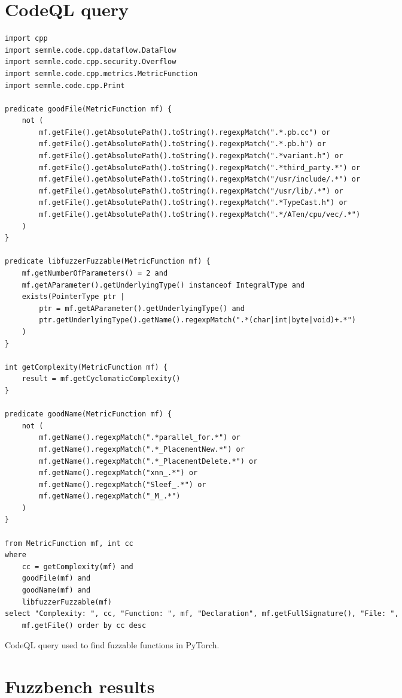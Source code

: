 \appendix

\section{CodeQL query} \label{appendix:codeql-query}

\renewcommand\theFancyVerbLine{\footnotesize\arabic{FancyVerbLine}}
\newenvironment{code}{\captionsetup{type=listing}}{}

\begin{code}
    \begin{verbatim}
import cpp
import semmle.code.cpp.dataflow.DataFlow
import semmle.code.cpp.security.Overflow
import semmle.code.cpp.metrics.MetricFunction
import semmle.code.cpp.Print

predicate goodFile(MetricFunction mf) {
    not (
        mf.getFile().getAbsolutePath().toString().regexpMatch(".*.pb.cc") or
        mf.getFile().getAbsolutePath().toString().regexpMatch(".*.pb.h") or
        mf.getFile().getAbsolutePath().toString().regexpMatch(".*variant.h") or
        mf.getFile().getAbsolutePath().toString().regexpMatch(".*third_party.*") or
        mf.getFile().getAbsolutePath().toString().regexpMatch("/usr/include/.*") or
        mf.getFile().getAbsolutePath().toString().regexpMatch("/usr/lib/.*") or
        mf.getFile().getAbsolutePath().toString().regexpMatch(".*TypeCast.h") or
        mf.getFile().getAbsolutePath().toString().regexpMatch(".*/ATen/cpu/vec/.*")
    )
}

predicate libfuzzerFuzzable(MetricFunction mf) {
    mf.getNumberOfParameters() = 2 and
    mf.getAParameter().getUnderlyingType() instanceof IntegralType and
    exists(PointerType ptr |
        ptr = mf.getAParameter().getUnderlyingType() and
        ptr.getUnderlyingType().getName().regexpMatch(".*(char|int|byte|void)+.*")
    )
}

int getComplexity(MetricFunction mf) {
    result = mf.getCyclomaticComplexity()
}

predicate goodName(MetricFunction mf) {
    not (
        mf.getName().regexpMatch(".*parallel_for.*") or
        mf.getName().regexpMatch(".*_PlacementNew.*") or
        mf.getName().regexpMatch(".*_PlacementDelete.*") or
        mf.getName().regexpMatch("xnn_.*") or
        mf.getName().regexpMatch("Sleef_.*") or
        mf.getName().regexpMatch("_M_.*")
    )
}

from MetricFunction mf, int cc
where
    cc = getComplexity(mf) and
    goodFile(mf) and
    goodName(mf) and
    libfuzzerFuzzable(mf)
select "Complexity: ", cc, "Function: ", mf, "Declaration", mf.getFullSignature(), "File: ",
    mf.getFile() order by cc desc
\end{verbatim}
    \caption{CodeQL query used to find fuzzable functions in PyTorch.}
\end{code}

\section{Fuzzbench results} \label{appendix:fuzzbench-results}